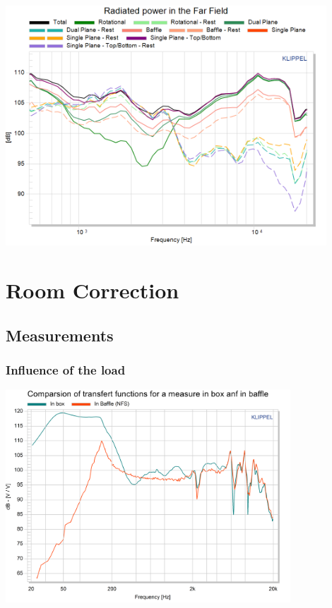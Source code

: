 \documentclass{report}
\begin{document}
\begin{appendices}
\begin{center}
	\includegraphics[width=0.9\textwidth]{Appendix/Rad_Pow_BnO_ZoomHF}
    \captionsetup{hypcap=false}
    \label{Curves:2way}
\end{center}


\section{Room Correction}

\subsection{Measurements}

\subsubsection{Influence of the load}
\label{Curves:InfluLoad}

\begin{center}
	\includegraphics[width=0.8\textwidth]{RoomComp/Compa_NFS_BAffle} 
    \captionsetup{hypcap=false} 
	\label{fig:Load_Compa}
\end{center}



\end{appendices}
\end{document}

